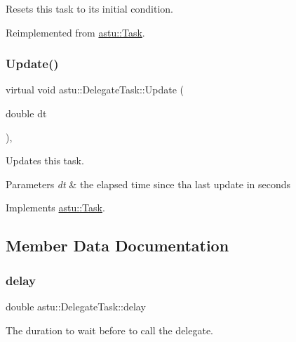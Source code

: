 Resets this task to its initial condition. 

Reimplemented from \hyperlink{classastu_1_1Task_af68025df1de6ad31882f0ccee5ccb100}{astu\+::\+Task}.

\mbox{\label{classastu_1_1DelegateTask_a48755ab30194963c37e22ed118423704}} 
\subsubsection{\texorpdfstring{Update()}{Update()}}
{\footnotesize\ttfamily virtual void astu\+::\+Delegate\+Task\+::\+Update (\begin{DoxyParamCaption}\item[{double}]{dt }\end{DoxyParamCaption})\hspace{0.3cm}{\ttfamily [override]}, {\ttfamily [virtual]}}

Updates this task.


\begin{DoxyParams}{Parameters}
{\em dt} & the elapsed time since tha last update in seconds \\
\hline
\end{DoxyParams}


Implements \hyperlink{classastu_1_1Task_a2bcec3cc42b46cfcb03422e029577c0a}{astu\+::\+Task}.



\subsection{Member Data Documentation}
\mbox{\label{classastu_1_1DelegateTask_a448096d7fea7f9a18490fbaa05616995}} 
\subsubsection{\texorpdfstring{delay}{delay}}
{\footnotesize\ttfamily double astu\+::\+Delegate\+Task\+::delay}

The duration to wait before to call the delegate. \mbox{\label{classastu_1_1DelegateTask_a9dc938c77515b4be4501df66f8cb260c}} 
